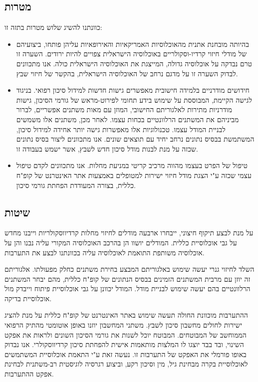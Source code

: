 \documentclass[a4paper,12pt]{article}
\begin{document}
\begin{hebrew}
		\subsection*{מטרות}
			כוונתנו להשיג שלוש מטרות בתזה זו:
			\begin{itemize}
				\item בהיותה מובחנת אתנית מהאוכלוסיות האמריקאיות והאירופאיות עליהן פותחו, ביצועיהם של מודלי חיזוי קרדיו-וסקולריים באוכלוסיה הישראלית צפויים להיות ירודים. השערה זו טרם נבדקה על אוכלוסיה גדולה, המייצגת את האוכלוסיה הישראלית כולה\cite{Lovis2015}. אנו מתכוונים לבדוק השערה זו על מדגם נרחב של האוכלוסיה הישראלית, בהקשר של חיזוי שבץ.
				\item חידושים מודרניים בלמידה חישובית מאפשרים גישות חדשות למידול סיכון רפואי\cite{Obermeyer2016}. בניגוד לגישה הקיימת, המבוססת על שימוש בידע תחומי לפירוט-מראש של גורמי הסיכון, גישות מודרניות מתירות לאלגוריתם החישובי, המוזן עם מאות משתנים אפשריים, לברור מביניהם את המשתנים הרלוונטיים בכחות עצמו\cite{Weng2017}. לאחר מכן, משתנים אלו משמשים לבניית המודל עצמו. טכנולוגיות אלו מאפשרות גישה יותר אחידה למידול סיכון, המשתמשת בבסיס נתונים נרחב יחיד עם תוצאים שונים\cite{Rajkomar2018}. אנו מתכוונים ליצור בסיס נתונים שכזה על מנת לבנות מודל סיכון חדש  לשבץ, אשר ישמש בעבודה זו.
				\item טיפול של הפרט בעצמו מהווה מרכיב קריטי במניעת מחלות\cite{Organization1984}. אנו מתכוונים לקדם טיפול עצמי שכזה ע"י הצגת מודל חיזוי ישירות למטופלים באמצעות אתר האינטרנט של קופ"ח כללית, בצורה המעודדת הפחתת גורמי סיכון.
			\end{itemize}
		
		\subsection*{שיטות}
			על מנת לבצע תיקוף חיצוני, ייבחרו ארבעה מודלים לחיזוי מחלות קרדיווסקולריות וייבנו מחדש על גבי אוכלוסיית כללית. המודלים יושוו הן בהרכב האוכלוסיה המקורי עליה נבנו והן על אוכלוסיה משותפת התואמת לאוכלוסיה עליה בכוונתנו לבצע את התערבות.
			
			השלד לחיזוי גנרי יעשה שימוש באלגוריתם המבצע בחירת משתנים כחלק מפעולתו. אלגוריתם זה יוזן עם מרבית המשתנים הזמינים בבסיס הנתונים של קופ"ח כללית, מהם יבחר המשתנים הרלוונטיים בהם יעשה שימוש לבניית מודל. המודל יכוונן על גבי אוכלוסיית פיתוח וייבדק מול אוכלוסיית בדיקה.
			
			ההתערבות מוכוונת החולה תעשה שימוש באתר האינטרנט של קופ"ח כללית על מנת להציג ישירות לחולים מחשבון סיכון לשבץ. משתני המחשבון יוזנו באופן אוטומטי מהתיק הרפואי הממוחשב של המבוטחים. המבוטח יוכל לשנות את גורמי הסיכון השונים ולראות את אפקט השינוי, ובד בבד יוצגו לו המלצות מותאמות אישית להפחתת סיכון קרדיווסקולרי. אנו נבדוק באופו פורמלי את האפקט של התערבות זו. נעשה זאת ע"י התאמת אוכלוסיית המשתמשים לאוכלוסיית בקרה מבחינת גיל, מין וסיכון רקע, וביצוע רגרסיה לוגיסטית רב-משתנית לבחינת אפקט ההתערבות.
			

\end{hebrew}
\end{document}
